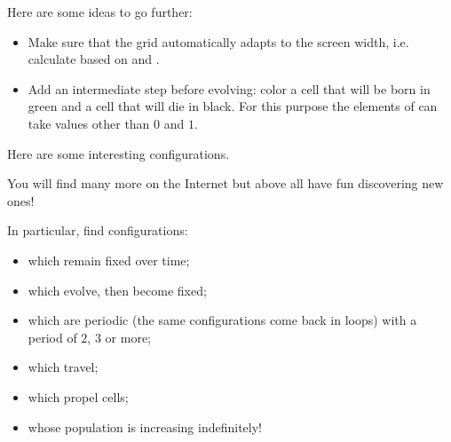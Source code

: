 \documentclass[11pt,class=report,crop=false]{standalone}
\begin{document}
Here are some ideas to go further:
\begin{itemize}
  \item Make sure that the grid automatically adapts to the screen width, i.e. calculate  based on  and .
  
  \item Add an intermediate step before evolving: color  a cell that will be born  in green and a cell that will die in black. For this purpose the elements of  can take values other than $0$ and $1$.
\end{itemize}

Here are some interesting configurations. 

You will find many more on the Internet but above all have fun discovering new ones!

In particular, find configurations:
\begin{itemize}
  \item which remain fixed over time;
  \item which evolve, then become fixed;
  \item which are periodic (the same configurations come back in loops) with a period of $2$, $3$ or more;
  \item which travel;
  \item which propel cells; 
  \item whose population is increasing indefinitely!
\end{itemize}
\end{document}
